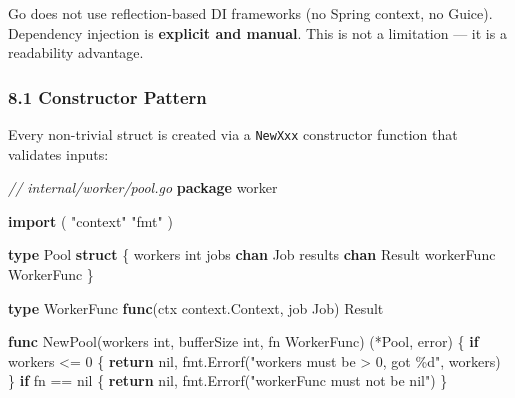 \documentclass[
]{article}
\newenvironment{Shaded}{}{}
\newcommand{\CommentTok}[1]{\textcolor[rgb]{0.38,0.63,0.69}{\textit{#1}}}
\newcommand{\ControlFlowTok}[1]{\textcolor[rgb]{0.00,0.44,0.13}{\textbf{#1}}}
\newcommand{\DataTypeTok}[1]{\textcolor[rgb]{0.56,0.13,0.00}{#1}}
\newcommand{\DecValTok}[1]{\textcolor[rgb]{0.25,0.63,0.44}{#1}}
\newcommand{\KeywordTok}[1]{\textcolor[rgb]{0.00,0.44,0.13}{\textbf{#1}}}
\newcommand{\NormalTok}[1]{#1}
\newcommand{\OperatorTok}[1]{\textcolor[rgb]{0.40,0.40,0.40}{#1}}
\newcommand{\OtherTok}[1]{\textcolor[rgb]{0.00,0.44,0.13}{#1}}
\newcommand{\StringTok}[1]{\textcolor[rgb]{0.25,0.44,0.63}{#1}}
\begin{document}
Go does not use reflection-based DI frameworks (no Spring context, no
Guice). Dependency injection is \textbf{explicit and manual}. This is
not a limitation --- it is a readability advantage.

\hypertarget{constructor-pattern}{%
\subsubsection{8.1 Constructor Pattern}\label{constructor-pattern}}

Every non-trivial struct is created via a \texttt{NewXxx} constructor
function that validates inputs:

\begin{Shaded}
\begin{Highlighting}[]
\CommentTok{// internal/worker/pool.go}
\KeywordTok{package}\NormalTok{ worker}

\KeywordTok{import} \OperatorTok{(}
    \StringTok{"context"}
    \StringTok{"fmt"}
\OperatorTok{)}

\KeywordTok{type}\NormalTok{ Pool }\KeywordTok{struct} \OperatorTok{\{}
\NormalTok{    workers    }\DataTypeTok{int}
\NormalTok{    jobs       }\KeywordTok{chan}\NormalTok{ Job}
\NormalTok{    results    }\KeywordTok{chan}\NormalTok{ Result}
\NormalTok{    workerFunc WorkerFunc}
\OperatorTok{\}}

\KeywordTok{type}\NormalTok{ WorkerFunc }\KeywordTok{func}\OperatorTok{(}\NormalTok{ctx context}\OperatorTok{.}\NormalTok{Context}\OperatorTok{,}\NormalTok{ job Job}\OperatorTok{)}\NormalTok{ Result}

\KeywordTok{func}\NormalTok{ NewPool}\OperatorTok{(}\NormalTok{workers }\DataTypeTok{int}\OperatorTok{,}\NormalTok{ bufferSize }\DataTypeTok{int}\OperatorTok{,}\NormalTok{ fn WorkerFunc}\OperatorTok{)} \OperatorTok{(*}\NormalTok{Pool}\OperatorTok{,} \DataTypeTok{error}\OperatorTok{)} \OperatorTok{\{}
    \ControlFlowTok{if}\NormalTok{ workers }\OperatorTok{\textless{}=} \DecValTok{0} \OperatorTok{\{}
        \ControlFlowTok{return} \OtherTok{nil}\OperatorTok{,}\NormalTok{ fmt}\OperatorTok{.}\NormalTok{Errorf}\OperatorTok{(}\StringTok{"workers must be \textgreater{} 0, got \%d"}\OperatorTok{,}\NormalTok{ workers}\OperatorTok{)}
    \OperatorTok{\}}
    \ControlFlowTok{if}\NormalTok{ fn }\OperatorTok{==} \OtherTok{nil} \OperatorTok{\{}
        \ControlFlowTok{return} \OtherTok{nil}\OperatorTok{,}\NormalTok{ fmt}\OperatorTok{.}\NormalTok{Errorf}\OperatorTok{(}\StringTok{"workerFunc must not be nil"}\OperatorTok{)}
    \OperatorTok{\}}


\end{Highlighting}
\end{Shaded}
\end{document}
